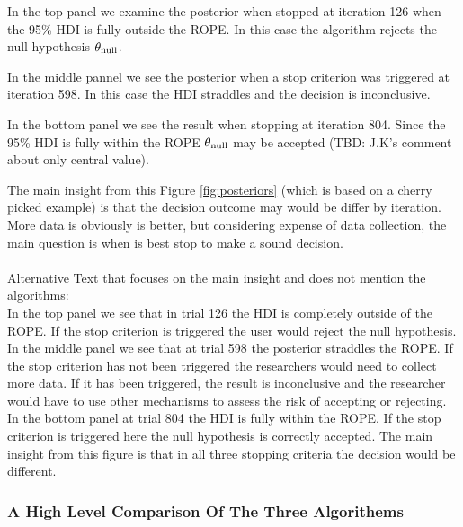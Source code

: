 In the top panel we examine the posterior
when stopped at iteration 126 when the 95\% HDI is fully outside the ROPE.
In this case the algorithm %
rejects the null hypothesis $\theta_{\rm null}$.

In the middle pannel we see the posterior
when a stop criterion was triggered at iteration 598.
In this case the HDI straddles and the decision is inconclusive.

In the bottom panel we see the result
when stopping at iteration 804.
Since the 95\% HDI is fully within the ROPE
$\theta_{\rm null}$ may be accepted (TBD: J.K's comment about only central value).

The main insight from this Figure \ref{fig:posteriors} (which is based on a 
cherry picked example) is that the decision outcome may would be differ by iteration.
More data is obviously is better, but considering expense of data collection, the main question is when is best stop to make a sound decision.
\\
\\
Alternative Text that focuses on the main insight and does not mention the algorithms:\\


In the top panel we see that in trial 126 the HDI is completely outside of the ROPE.
If the stop criterion is triggered the user would reject the null hypothesis.
In the middle panel we see that at trial 598 the posterior straddles the ROPE.
If the stop criterion has not been triggered the researchers would need to collect more
data. If it has been triggered, the result is inconclusive and the researcher would have
to use other mechanisms to assess the risk of accepting or rejecting. In the bottom
panel at trial 804 the HDI is fully within the ROPE. If the stop criterion is triggered
here the null hypothesis is correctly accepted. The main insight from this figure is
that in all three stopping criteria the decision would be different.

\subsubsection{A High Level Comparison Of The Three Algorithems}

